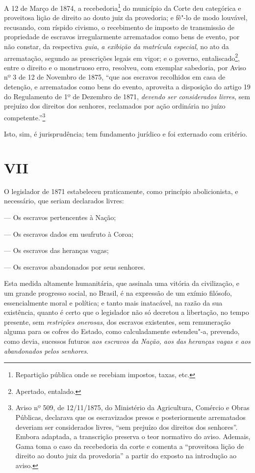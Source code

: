 A 12 de Março de 1874, a recebedoria\footnote{Repartição pública onde
  se recebiam impostos, taxas, etc.} do município da Corte deu
categórica e proveitosa lição de direito ao douto juiz da provedoria; e
fê"-lo de modo louvável, recusando, com ríspido civismo, o recebimento de
imposto de transmissão de propriedade de escravos irregularmente
arrematados como bens de evento, por não constar, da respectiva
\emph{guia}, \emph{a exibição da matrícula especial}, no ato da
arrematação, segundo as prescrições legais em vigor; e o governo,
entaliscado\footnote{Apertado, entalado.}, entre o direito e o
monstruoso erro, resolveu, com exemplar sabedoria, por Aviso nº 3 de 12
de Novembro de 1875, ``que aos escravos recolhidos em casa de detenção, e
arrematados como bens do evento, aproveita a disposição do artigo 19 do
Regulamento de 1º de Dezembro de 1871, \emph{devendo ser considerados
livres}, sem prejuízo dos direitos dos senhores, reclamados por ação
ordinária no juízo competente.''\footnote{Aviso nº 509, de 12/11/1875,
  do Ministério da Agricultura, Comércio e Obras Públicas, declarava que
  os escravizados presos e posteriormente arrematados deveriam ser
  considerados livres, ``sem prejuízo dos direitos dos senhores''. Embora
  adaptada, a transcrição preserva o teor normativo do aviso. Ademais,
  Gama toma o caso da recebedoria da corte e comenta a ``proveitosa lição
  de direito ao douto juiz da provedoria'' a partir do exposto na
  introdução ao aviso.}

Isto, sim, é jurisprudência; tem fundamento jurídico e foi externado com
critério.

\section*{VII}

O legislador de 1871 estabeleceu praticamente, como princípio
abolicionista, e necessário, que seriam declarados livres:

--- Os escravos pertencentes à Nação;

--- Os escravos dados em usufruto à Coroa;

--- Os escravos das heranças vagas;

--- Os escravos abandonados por seus senhores.

Esta medida altamente humanitária, que assinala uma vitória da
civilização, e um grande progresso social, no Brasil, é na expressão de
um exímio filósofo, essencialmente moral e política; e tanto mais
inatacável, na razão da sua existência, quanto é certo que o legislador
não só decretou a libertação, no tempo presente, sem \emph{restrições
onerosas}, dos escravos existentes, sem remuneração alguma para os
cofres do Estado, como calculadamente estendeu"-a, prevendo, como devia,
sucessos futuros \emph{aos escravos da Nação, aos das heranças vagas e
aos abandonados pelos senhores}.

